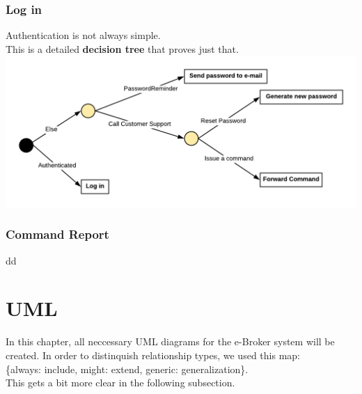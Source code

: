 \documentclass{article}
\begin{document}
\subsubsection{Log in}
Authentication is not always simple.\\
This is a detailed \textbf{decision tree} that proves just that.\\
\includegraphics[scale=0.3]{decisionTree} 

\subsubsection{Command Report}
dd

\newpage
\section{UML}
In this chapter, all neccessary UML diagrams for the e-Broker system will be created. In order to distinquish relationship types, we used this map: \\\hspace*{16mm}\{always: include, might: extend, generic: generalization\}. \\
This gets a bit more clear in the following subsection. 
\end{document}
